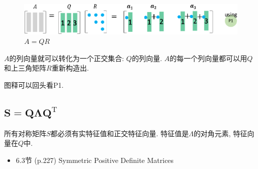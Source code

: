 \documentclass[letterpaper]{article}
\DeclareRobustCommand\transp{^{\mathrm{T}}}
\begin{document}
\begin{figure}[H]
  \centering
  \includegraphics[scale=0.8]{QR.eps}
  \caption{$A=QR$}
\end{figure}

$A$的列向量就可以转化为一个正交集合: $Q$的列向量. 
$A$的每一个列向量都可以用$Q$和上三角矩阵$R$重新构造出. 

图释可以回头看P1.


\subsection{$\boldsymbol{S=Q \Lambda Q\transp}$}

所有对称矩阵$S$都必须有实特征值和正交特征向量. 
特征值是$\Lambda$的对角元素, 特征向量在$Q$中. 

\begin{itemize}
  \item 6.3节 (p.227) Symmetric Positive Definite Matrices
\end{itemize}
\end{document}
